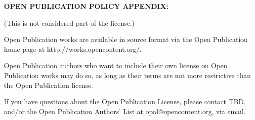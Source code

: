 {\bf OPEN PUBLICATION POLICY APPENDIX:}

(This is not considered part of the license.)

Open Publication works are available in source format via the Open
Publication home page at http://works.opencontent.org/.

Open Publication authors who want to include their own license on Open
Publication works may do so, as long as their terms are not more
restrictive than the Open Publication license.

If you have questions about the Open Publication License, please contact
TBD, and/or the Open Publication Authors' List at opal@opencontent.org,
via email.

\vspace*{\fill}

\newpage
